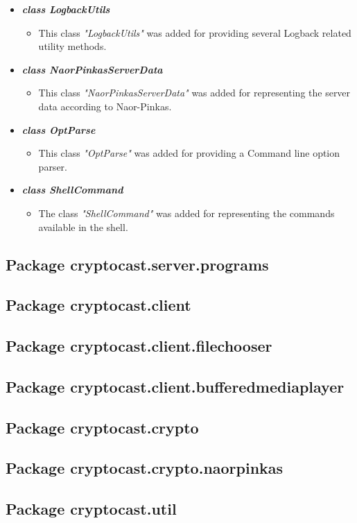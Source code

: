 \documentclass[a4paper,10pt]{scrartcl}
\begin{document}
\begin{itemize}
   \item \textbf{\textit{class LogbackUtils}}
	\begin{itemize}
	 \item This class \textit{"LogbackUtils"} was added for providing several Logback related utility methods.
	\end{itemize}
	
	 \item \textbf{\textit{class NaorPinkasServerData}}
	\begin{itemize}
	 \item This class \textit{"NaorPinkasServerData"} was added for representing the server data according to Naor-Pinkas.
	\end{itemize}
	
	 \item \textbf{\textit{class OptParse}}
	\begin{itemize}
	 \item This class \textit{"OptParse"} was added for providing a Command line option parser.
	\end{itemize}
	
   \item \textit{\textbf{class ShellCommand}}
	\begin{itemize}
	 \item The class \textit{"ShellCommand"} was added for representing the commands available in the shell.
	\end{itemize}
	
\end{itemize}


\subsection{Package cryptocast.server.programs}
\subsection{Package cryptocast.client}
\subsection{Package cryptocast.client.filechooser}
\subsection{Package cryptocast.client.bufferedmediaplayer}
\subsection{Package cryptocast.crypto}
\subsection{Package cryptocast.crypto.naorpinkas}
\subsection{Package cryptocast.util}
\end{document}
